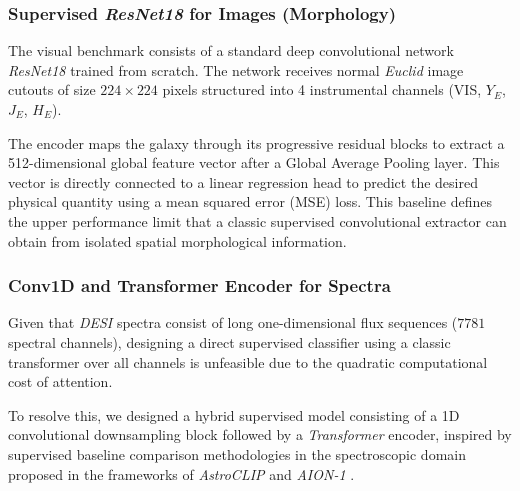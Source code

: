 \subsubsection{Supervised \textit{ResNet18} for Images (Morphology)}

The visual benchmark consists of a standard deep convolutional network \textit{ResNet18} \autocite{ar:he-2016} trained from scratch. The network receives normal \textit{Euclid} image cutouts of size $224 \times 224$ pixels structured into 4 instrumental channels (VIS, $Y_E$, $J_E$, $H_E$).

The encoder maps the galaxy through its progressive residual blocks to extract a 512-dimensional global feature vector after a Global Average Pooling layer. This vector is directly connected to a linear regression head to predict the desired physical quantity using a mean squared error (MSE) loss. This baseline defines the upper performance limit that a classic supervised convolutional extractor can obtain from isolated spatial morphological information.

\subsubsection{Conv1D and Transformer Encoder for Spectra}

Given that \textit{DESI} spectra consist of long one-dimensional flux sequences ($7781$ spectral channels), designing a direct supervised classifier using a classic transformer over all channels is unfeasible due to the quadratic computational cost of attention.

To resolve this, we designed a hybrid supervised model consisting of a 1D convolutional downsampling block followed by a \textit{Transformer} encoder, inspired by supervised baseline comparison methodologies in the spectroscopic domain proposed in the frameworks of \textit{AstroCLIP} \autocite{ar:astroclip} and \textit{AION-1} \autocite{ar:aion-1}.

